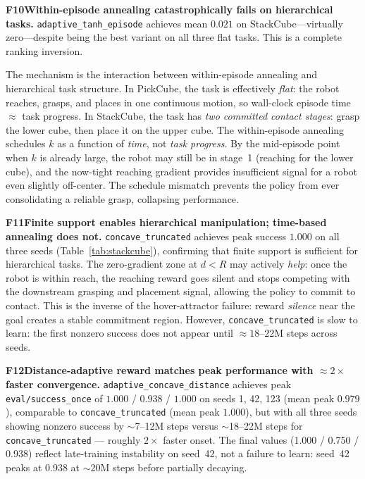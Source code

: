 \documentclass{article}
\newcommand{\finding}[2]{%
  \noindent\textcolor{repcrimson}{\textbf{#1}}\;\textbf{#2.}\enspace}
\begin{document}
\finding{F10}{Within-episode annealing catastrophically fails on hierarchical tasks}
\texttt{adaptive\_tanh\_episode} achieves mean $0.021$ on StackCube---virtually
zero---despite being the best variant on all three flat tasks. This is a complete
ranking inversion.

The mechanism is the interaction between within-episode annealing and hierarchical
task structure. In PickCube, the task is effectively \emph{flat}: the robot reaches,
grasps, and places in one continuous motion, so wall-clock episode time $\approx$
task progress. In StackCube, the task has \emph{two committed contact stages}: grasp
the lower cube, then place it on the upper cube. The within-episode annealing
schedules $k$ as a function of \emph{time}, not \emph{task progress}. By the
mid-episode point when $k$ is already large, the robot may still be in stage~1
(reaching for the lower cube), and the now-tight reaching gradient provides
insufficient signal for a robot even slightly off-center. The schedule mismatch
prevents the policy from ever consolidating a reliable grasp, collapsing performance.

\finding{F11}{Finite support enables hierarchical manipulation; time-based annealing does not}
\texttt{concave\_truncated} achieves peak success $1.000$ on all three seeds
(Table~\ref{tab:stackcube}), confirming that finite support is sufficient for
hierarchical tasks. The zero-gradient zone at $d < R$ may actively \emph{help}: once
the robot is within reach, the reaching reward goes silent and stops competing with the
downstream grasping and placement signal, allowing the policy to commit to contact.
This is the inverse of the hover-attractor failure: reward \emph{silence} near the
goal creates a stable commitment region. However, \texttt{concave\_truncated} is slow
to learn: the first nonzero success does not appear until $\approx\!18$--$22$M steps
across seeds.

\finding{F12}{Distance-adaptive reward matches peak performance with $\approx\!2\times$ faster convergence}
\texttt{adaptive\_concave\_distance} achieves peak \texttt{eval/success\_once} of
$1.000$ / $0.938$ / $1.000$ on seeds 1, 42, 123 (mean peak $\mathbf{0.979}$),
comparable to \texttt{concave\_truncated} (mean peak $1.000$), but with all three
seeds showing nonzero success by $\sim$7--12M steps versus $\sim$18--22M steps for
\texttt{concave\_truncated} --- roughly $2\times$ faster onset. The final values
(1.000 / 0.750 / 0.938) reflect late-training instability on seed~42, not a failure to
learn: seed~42 peaks at 0.938 at $\sim$20M steps before partially decaying.
\end{document}
